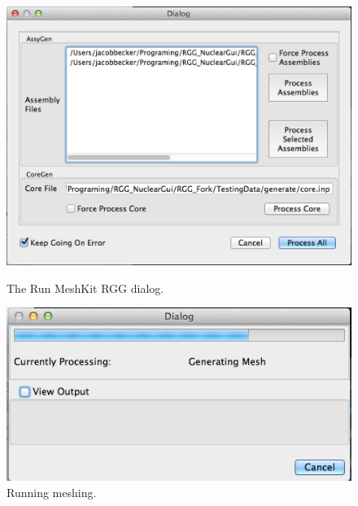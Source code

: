 \begin{figure}[h]
\centering
\begin{minipage}{.45\textwidth}
  \begin{center}
		\includegraphics[width=0.70\linewidth]{Images/mesh-4.png}
		\caption{The Run MeshKit RGG dialog.}
		\label{fig:Mesh_dialog}
	\end{center}
\end{minipage} \hspace{.5cm}%
\begin{minipage}{.45\textwidth}
  \begin{center}
		\includegraphics[width=0.85\linewidth]{Images/mesh-5.png}
		\caption{Running meshing.}
		\label{fig:running_mesh}
	\end{center}
\end{minipage}
\end{figure}

